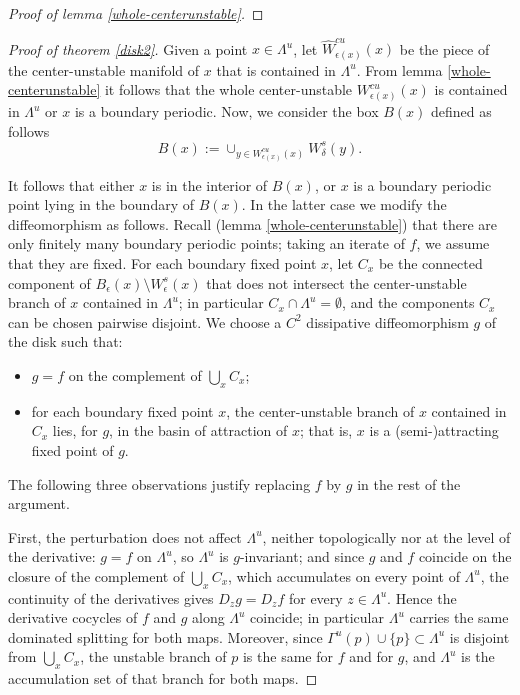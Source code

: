 \documentclass[a4paper,11pt]{article}
\theoremstyle{definition}
\def\La{\Lambda}
\def\e{\epsilon}
\def\eps{\epsilon}
\def\Ga{\Gamma}
\def\de{\delta}
\def\La{\Lambda}
\def\eps{\epsilon}
\def\Ga{\Gamma}
\begin{document}
\begin{proof}[Proof of lemma \ref{whole-centerunstable}]


\end{proof}





\begin{proof}[Proof of theorem \ref{disk2}]






Given a point $x\in \La^u$, let $\hat W^{cu}_{\e(x)}(x)$ be the piece of the center-unstable manifold of $x$ that is contained in $\La^u.$ From lemma \ref{whole-centerunstable} it follows that the whole center-unstable $W^{cu}_{\e(x)}(x)$ is contained in $\La^u$ or $x$ is a boundary periodic. Now, we consider the box $B(x)$ defined as follows  $$B(x):=\cup_{y\in W^{cu}_{\eps(x)}(x)}W^s_\de(y).$$ 


It follows that either $x$ is in the interior of $B(x)$, or $x$ is a boundary
periodic point lying in the boundary of $B(x)$. In the latter case we modify
the diffeomorphism as follows. Recall (lemma \ref{whole-centerunstable})
that there are only finitely many boundary periodic points; taking an
iterate of $f$, we assume that they are fixed. For each boundary fixed point
$x$, let $C_x$ be the connected component of $B_\e(x)\setminus W^s_\e(x)$
that does not intersect the center-unstable branch of $x$ contained in
$\La^u$; in particular $C_x\cap \La^u=\emptyset$, and the components $C_x$
can be chosen pairwise disjoint. We choose a $C^2$ dissipative
diffeomorphism $g$ of the disk such that:
\begin{itemize}
\item[--] $g=f$ on the complement of $\bigcup_x C_x$;
\item[--] for each boundary fixed point $x$, the center-unstable branch of
$x$ contained in $C_x$ lies, for $g$, in the basin of attraction of $x$;
that is, $x$ is a (semi-)attracting fixed point of $g$.
\end{itemize}

The following three observations justify replacing $f$ by $g$ in the rest of
the argument.

First, the perturbation does not affect $\La^u$, neither topologically nor
at the level of the derivative: $g=f$ on $\La^u$, so $\La^u$ is
$g$-invariant; and since $g$ and $f$ coincide on the closure of the
complement of $\bigcup_x C_x$, which accumulates on every point of $\La^u$,
the continuity of the derivatives gives $D_zg=D_zf$ for every $z\in\La^u$.
Hence the derivative cocycles of $f$ and $g$ along $\La^u$ coincide; in
particular $\La^u$ carries the same dominated splitting for both maps. Moreover, since
$\Ga^u(p)\cup\{p\}\subset \La^u$ is disjoint from $\bigcup_x C_x$, the
unstable branch of $p$ is the same for $f$ and for $g$, and $\La^u$ is the
accumulation set of that branch for both maps.


\end{proof}
\end{document}
